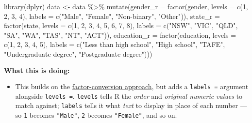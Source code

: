\documentclass[
  letterpaper,
  DIV=11,
  numbers=noendperiod]{scrreprt}
\newenvironment{Shaded}{\begin{snugshade}}{\end{snugshade}}
\newcommand{\AttributeTok}[1]{\textcolor[rgb]{0.40,0.45,0.13}{#1}}
\newcommand{\DecValTok}[1]{\textcolor[rgb]{0.68,0.00,0.00}{#1}}
\newcommand{\FunctionTok}[1]{\textcolor[rgb]{0.28,0.35,0.67}{#1}}
\newcommand{\NormalTok}[1]{\textcolor[rgb]{0.00,0.23,0.31}{#1}}
\newcommand{\OtherTok}[1]{\textcolor[rgb]{0.00,0.23,0.31}{#1}}
\newcommand{\SpecialCharTok}[1]{\textcolor[rgb]{0.37,0.37,0.37}{#1}}
\newcommand{\StringTok}[1]{\textcolor[rgb]{0.13,0.47,0.30}{#1}}
\providecommand{\tightlist}{%
  \setlength{\itemsep}{0pt}\setlength{\parskip}{0pt}}\usepackage{longtable,booktabs,array}
\begin{document}
\begin{Shaded}
\begin{Highlighting}[]
\FunctionTok{library}\NormalTok{(dplyr)  data }\OtherTok{\textless{}{-}}\NormalTok{ data }\SpecialCharTok{\%\textgreater{}\%}   \FunctionTok{mutate}\NormalTok{(}\AttributeTok{gender\_r =} \FunctionTok{factor}\NormalTok{(gender,                           }\AttributeTok{levels =} \FunctionTok{c}\NormalTok{(}\DecValTok{1}\NormalTok{, }\DecValTok{2}\NormalTok{, }\DecValTok{3}\NormalTok{, }\DecValTok{4}\NormalTok{),                           }\AttributeTok{labels =} \FunctionTok{c}\NormalTok{(}\StringTok{"Male"}\NormalTok{, }\StringTok{"Female"}\NormalTok{, }\StringTok{"Non{-}binary"}\NormalTok{, }\StringTok{"Other"}\NormalTok{)),                    }\AttributeTok{state\_r =} \FunctionTok{factor}\NormalTok{(state,                           }\AttributeTok{levels =} \FunctionTok{c}\NormalTok{(}\DecValTok{1}\NormalTok{, }\DecValTok{2}\NormalTok{, }\DecValTok{3}\NormalTok{, }\DecValTok{4}\NormalTok{, }\DecValTok{5}\NormalTok{, }\DecValTok{6}\NormalTok{, }\DecValTok{7}\NormalTok{, }\DecValTok{8}\NormalTok{),                           }\AttributeTok{labels =} \FunctionTok{c}\NormalTok{(}\StringTok{"NSW"}\NormalTok{, }\StringTok{"VIC"}\NormalTok{, }\StringTok{"QLD"}\NormalTok{, }\StringTok{"SA"}\NormalTok{, }\StringTok{"WA"}\NormalTok{, }\StringTok{"TAS"}\NormalTok{, }\StringTok{"NT"}\NormalTok{, }\StringTok{"ACT"}\NormalTok{)),                    }\AttributeTok{education\_r =} \FunctionTok{factor}\NormalTok{(education,                          }\AttributeTok{levels =} \FunctionTok{c}\NormalTok{(}\DecValTok{1}\NormalTok{, }\DecValTok{2}\NormalTok{, }\DecValTok{3}\NormalTok{, }\DecValTok{4}\NormalTok{, }\DecValTok{5}\NormalTok{),                          }\AttributeTok{labels =} \FunctionTok{c}\NormalTok{(}\StringTok{"Less than high school"}\NormalTok{, }\StringTok{"High school"}\NormalTok{, }\StringTok{"TAFE"}\NormalTok{,                                      }\StringTok{"Undergraduate degree"}\NormalTok{, }\StringTok{"Postgraduate degree"}\NormalTok{)))}
\end{Highlighting}
\end{Shaded}

\textbf{What this is doing:}

\begin{itemize}
\tightlist
\item
  This builds on the \href{recoding.qmd}{factor-conversion approach},
  but adds a \texttt{labels\ =} argument alongside \texttt{levels\ =}.
  \texttt{levels} tells R the \emph{order} and \emph{original numeric
  values} to match against; \texttt{labels} tells it what \emph{text} to
  display in place of each number --- so \texttt{1} becomes
  \texttt{"Male"}, \texttt{2} becomes \texttt{"Female"}, and so on.
\end{itemize}
\end{document}

